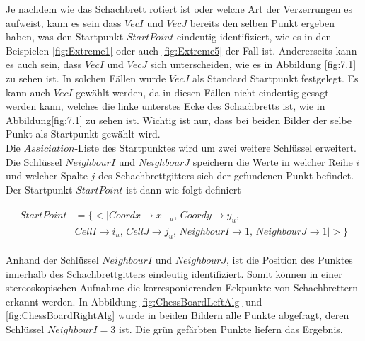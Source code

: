 Je nachdem wie das Schachbrett rotiert ist oder welche Art der Verzerrungen es aufweist, kann es sein dass $VecI$ und $VecJ$ bereits den selben Punkt ergeben haben, was den Startpunkt $StartPoint$ eindeutig identifiziert, wie es in den  Beispielen \ref{fig:Extreme1} oder auch \ref{fig:Extreme5} der Fall ist. Andererseits kann es auch sein, dass $VecI$ und $VecJ$ sich unterscheiden, wie es in Abbildung \ref{fig:7.1} zu sehen ist. In solchen Fällen wurde $VecJ$ als Standard Startpunkt festgelegt. Es kann auch $VecI$ gewählt werden, da in diesen Fällen nicht eindeutig gesagt werden kann, welches die linke unterstes Ecke des Schachbretts ist, wie in Abbildung\ref{fig:7.1} zu sehen ist. Wichtig ist nur, dass bei beiden Bilder der selbe Punkt als Startpunkt gewählt wird.\\

Die $Assiciation$-Liste des Startpunktes wird um zwei weitere Schlüssel erweitert. Die Schlüssel $NeighbourI$ und $NeighbourJ$ speichern die Werte in welcher Reihe $i$ und welcher Spalte $j$ des Schachbrettgitters sich der gefundenen Punkt befindet. Der Startpunkt $StartPoint$ ist dann wie folgt definiert



%

\begin{gather*}
	\begin{split}
			StartPoint &= \{ <|Coordx \rightarrow x-_u,\, Coordy \rightarrow y_u,\, \\
			&CellI \rightarrow i_u,\, CellJ \rightarrow j_u,\,
			NeighbourI \rightarrow 1, \,NeighbourJ \rightarrow 1 |>\}
	\end{split}
\end{gather*}
 
Anhand der Schlüssel $NeighbourI$ und $NeighbourJ$, ist die Position des Punktes innerhalb des Schachbrettgitters eindeutig identifiziert. Somit können in einer stereoskopischen Aufnahme die korresponierenden Eckpunkte von Schachbrettern erkannt werden. In Abbildung \ref{fig:ChessBoardLeftAlg} und \ref{fig:ChessBoardRightAlg} wurde in beiden Bildern alle Punkte abgefragt, deren Schlüssel $NeighbourI = 3$ ist. Die grün gefärbten Punkte liefern das Ergebnis. \\

